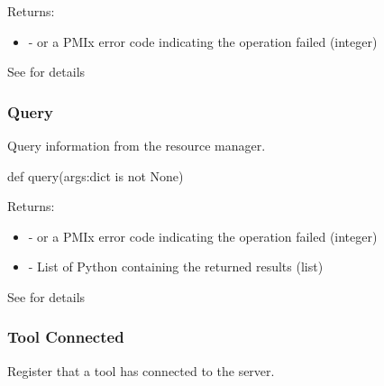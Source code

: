 Returns:
\begin{itemize}
    \item {} -  or a \ac{PMIx} error code indicating the operation failed (integer)
\end{itemize}

See  for details


\subsubsection{Query}

\summary

Query information from the resource manager.

\format

\pyspecificstart
\begin{codepar}
def query(args:dict is not None)
\end{codepar}
\pyspecificend

\begin{arglist}
\end{arglist}

Returns:
\begin{itemize}
    \item {} -  or a \ac{PMIx} error code indicating the operation failed (integer)
    \item {} - List of Python  containing the returned results (list)
\end{itemize}

See  for details


\subsubsection{Tool Connected}

\summary

Register that a tool has connected to the server.

